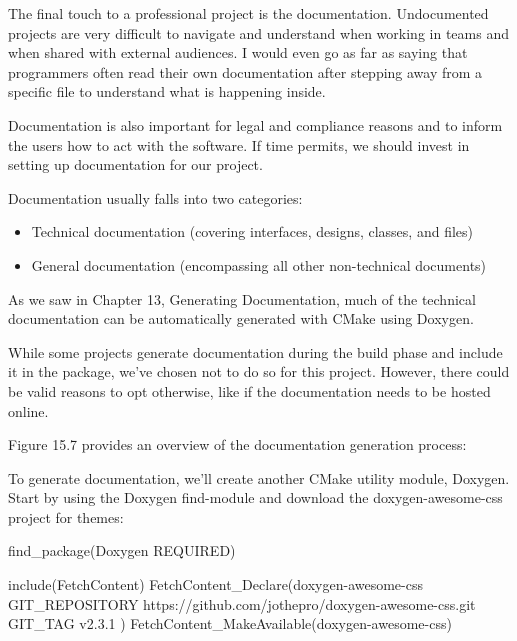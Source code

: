 

The final touch to a professional project is the documentation. Undocumented projects are very difficult to navigate and understand when working in teams and when shared with external audiences. I would even go as far as saying that programmers often read their own documentation after stepping away from a specific file to understand what is happening inside.

Documentation is also important for legal and compliance reasons and to inform the users how to act with the software. If time permits, we should invest in setting up documentation for our project.

Documentation usually falls into two categories:

\begin{itemize}
\item
Technical documentation (covering interfaces, designs, classes, and files)

\item
General documentation (encompassing all other non-technical documents)
\end{itemize}

As we saw in Chapter 13, Generating Documentation, much of the technical documentation can be automatically generated with CMake using Doxygen.


While some projects generate documentation during the build phase and include it in the package, we’ve chosen not to do so for this project. However, there could be valid reasons to opt otherwise, like if the documentation needs to be hosted online.

Figure 15.7 provides an overview of the documentation generation process:


To generate documentation, we’ll create another CMake utility module, Doxygen. Start by using the Doxygen find-module and download the doxygen-awesome-css project for themes:


\begin{cmake}
find_package(Doxygen REQUIRED)

include(FetchContent)
FetchContent_Declare(doxygen-awesome-css
    GIT_REPOSITORY
        https://github.com/jothepro/doxygen-awesome-css.git
    GIT_TAG
        v2.3.1
)
FetchContent_MakeAvailable(doxygen-awesome-css)
\end{cmake}

